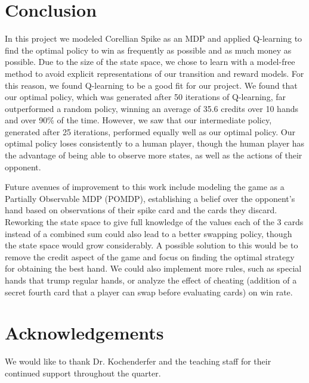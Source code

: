 \documentclass{article}
\begin{document}
\section{Conclusion}
In this project we modeled Corellian Spike as an MDP and applied Q-learning to find the optimal policy to win as frequently as possible and as much money as possible. Due to the size of the state space, we chose to learn with a model-free method to avoid explicit representations of our transition and reward models. For this reason, we found Q-learning to be a good fit for our project. 
We found that our optimal policy, which was generated after 50 iterations of Q-learning, far outperformed a random policy, winning an average of 35.6 credits over 10 hands and over 90\% of the time. However, we saw that our intermediate policy, generated after 25 iterations, performed equally well as our optimal policy. Our optimal policy loses consistently to a human player, though the human player has the advantage of being able to observe more states, as well as the actions of their opponent.

Future avenues of improvement to this work include modeling the game as a Partially Observable MDP (POMDP), establishing a belief over the opponent's hand based on observations of their spike card and the cards they discard. Reworking the state space to give full knowledge of the values each of the 3 cards instead of a combined sum could also lead to a better swapping policy, though the state space would grow considerably. A possible solution to this would be to remove the credit aspect of the game and focus on finding the optimal strategy for obtaining the best hand. We could also implement more rules, such as special hands that trump regular hands, or analyze the effect of cheating (addition of a secret fourth card that a player can swap before evaluating cards) on win rate.
\section*{Acknowledgements}
We would like to thank Dr. Kochenderfer and the teaching staff for their continued support throughout the quarter.
\end{document}
